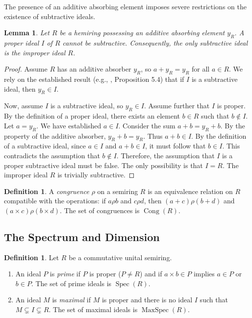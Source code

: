 \documentclass[11pt, a4paper]{article}
\theoremstyle{plain}
\newtheorem{lemma}[theorem]{Lemma}
\theoremstyle{definition}
\newtheorem{definition}[theorem]{Definition}
\numberwithin{equation}{section}
\DeclareMathOperator{\Spec}{Spec}
\DeclareMathOperator{\MaxSpec}{MaxSpec}
\DeclareMathOperator{\Cong}{Cong}
\begin{document}
The presence of an additive absorbing element imposes severe restrictions on the existence of subtractive ideals.

\begin{lemma}\label{lem:subtractive_and_additive_absorber}
Let $R$ be a hemiring possessing an additive absorbing element $y_R$. A proper ideal $I$ of $R$ cannot be subtractive. Consequently, the only subtractive ideal is the improper ideal $R$.
\end{lemma}
\begin{proof}
Assume $R$ has an additive absorber $y_R$, so $a+y_R=y_R$ for all $a \in R$.
We rely on the established result (e.g., \cite{GolanSemirings}, Proposition 5.4) that if $I$ is a subtractive ideal, then $y_R \in I$.

Now, assume $I$ is a subtractive ideal, so $y_R \in I$. Assume further that $I$ is proper. By the definition of a proper ideal, there exists an element $b \in R$ such that $b \notin I$.
Let $a=y_R$. We have established $a \in I$.
Consider the sum $a+b = y_R+b$. By the property of the additive absorber, $y_R+b = y_R$.
Thus $a+b \in I$.
By the definition of a subtractive ideal, since $a \in I$ and $a+b \in I$, it must follow that $b \in I$.
This contradicts the assumption that $b \notin I$.
Therefore, the assumption that $I$ is a proper subtractive ideal must be false. The only possibility is that $I=R$. The improper ideal $R$ is trivially subtractive.
\end{proof}

\begin{definition}\label{def:congruence}
A \emph{congruence} $\rho$ on a semiring $R$ is an equivalence relation on $R$ compatible with the operations: if $a \rho b$ and $c \rho d$, then $(a+c) \rho (b+d)$ and $(a\times c) \rho (b\times d)$. The set of congruences is $\Cong(R)$.
\end{definition}

\subsection{The Spectrum and Dimension}

\begin{definition}\label{def:prime_maximal_ideals}
Let $R$ be a commutative unital semiring.
\begin{enumerate}
    \item An ideal $P$ is \emph{prime} if $P$ is proper ($P \neq R$) and if $a\times b \in P$ implies $a \in P$ or $b \in P$. The set of prime ideals is $\Spec(R)$.
    \item An ideal $M$ is \emph{maximal} if $M$ is proper and there is no ideal $I$ such that $M \subsetneq I \subsetneq R$. The set of maximal ideals is $\MaxSpec(R)$.
\end{enumerate}
\end{definition}
\end{document}
